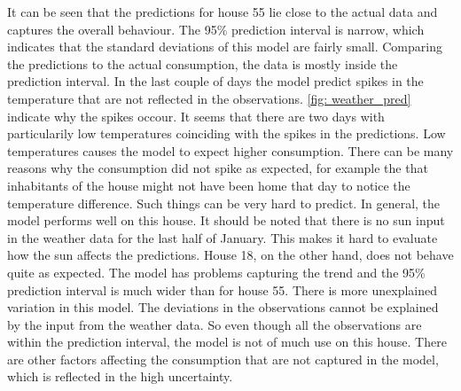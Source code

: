\noindent It can be seen that the predictions for house 55 lie close to the actual data and captures the overall behaviour.  The 95\% prediction interval is narrow, which indicates that the standard deviations of this model are fairly small. Comparing the predictions to the actual consumption, the data is mostly inside the prediction interval. In the last couple of days the model predict spikes in the temperature that are not reflected in the observations. \cref{fig: weather_pred} indicate why the spikes occour. It seems that there are two days with particularily low temperatures coinciding with the spikes in the predictions. Low temperatures causes the model to expect higher consumption. There can be many reasons why the consumption did not spike as expected, for example the that inhabitants of the house might not have been home that day to notice the temperature difference. Such things can be very hard to predict. In general, the model performs well on this house. It should be noted that there is no sun input in the weather data for the last half of January. This makes it hard to evaluate how the sun affects the predictions. House 18, on the other hand, does not behave quite as expected. The model has problems capturing the trend and the 95\% prediction interval is much wider than for house 55. There is more unexplained variation in this model. The deviations in the observations cannot be explained by the input from the weather data. So even though all the observations are within the prediction interval, the model is not of much use on this house. There are other factors affecting the consumption that are not captured in the model, which is reflected in the high uncertainty.\\
